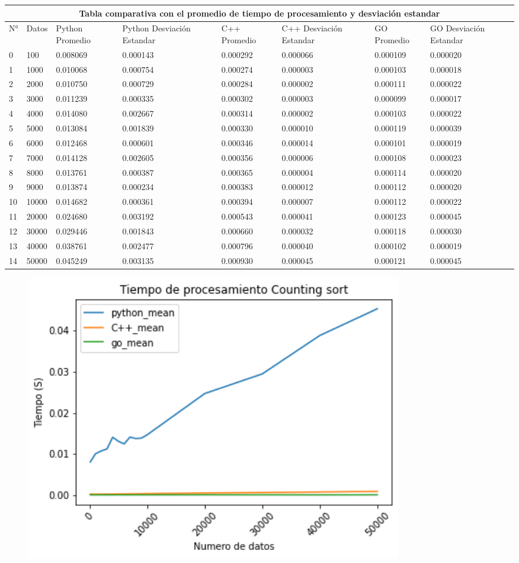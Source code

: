 \documentclass{article}
\begin{document}
\begin{enumerate}
        \begin{tabular}{ |p{0.3cm}||p{0.9cm}|p{1.5cm}|p{1.7cm}|p{1.5cm}|p{1.7cm}|p{1.8cm}|p{1.7cm}|  }
 \hline
 \multicolumn{8}{|c|}{Tabla comparativa con el promedio de tiempo de procesamiento y desviación estandar} \\
 \hline
 N°& Datos &Python Promedio &Python Desviación Estandar &C++ Promedio &C++ Desviación Estandar &GO Promedio &GO Desviación Estandar\\
 \hline
0 &100 &0.008069 &0.000143	&0.000292 &0.000066 &0.000109 &0.000020\\
1 &1000	&0.010068	&0.000754	&0.000274	&0.000003	&0.000103	&0.000018\\
2	&2000	&0.010750	&0.000729	&0.000284	&0.000002	&0.000111	&0.000022\\
3	&3000	&0.011239	&0.000335	&0.000302	&0.000003	&0.000099	&0.000017\\
4	&4000	&0.014080	&0.002667	&0.000314	&0.000002	&0.000103	&0.000022\\
5	&5000	&0.013084	&0.001839	&0.000330	&0.000010	&0.000119	&0.000039\\
6	&6000	&0.012468	&0.000601	&0.000346	&0.000014	&0.000101	&0.000019\\
7	&7000	&0.014128	&0.002605	&0.000356	&0.000006	&0.000108	&0.000023\\
8	&8000	&0.013761	&0.000387	&0.000365	&0.000004	&0.000114	&0.000020\\
9	&9000	&0.013874	&0.000234	&0.000383	&0.000012	&0.000112	&0.000020\\
10	&10000	&0.014682	&0.000361	&0.000394	&0.000007	&0.000112	&0.000022\\
11	&20000	&0.024680	&0.003192	&0.000543	&0.000041	&0.000123	&0.000045\\
12	&30000	&0.029446	&0.001843	&0.000660	&0.000032	&0.000118	&0.000030\\
13	&40000	&0.038761	&0.002477	&0.000796	&0.000040	&0.000102	&0.000019\\
14	&50000	&0.045249	&0.003135	&0.000930	&0.000045	&0.000121	&0.000045\\
\hline
\end{tabular}


\begin{figure}[H]
\centering
\includegraphics[width=0.8\textwidth]{Imagen/CS1.png}
\label{fig:QuickSort}
\end{figure}


\end{enumerate}
\end{document}
